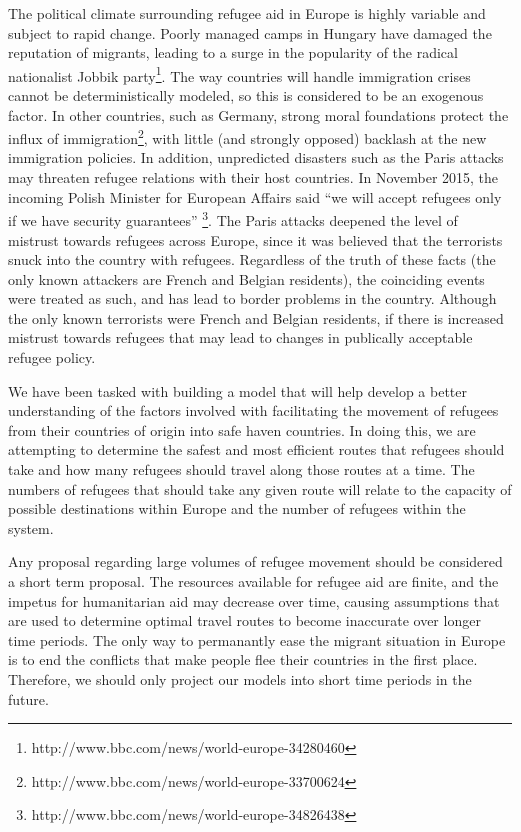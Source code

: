 \documentclass{article}
\begin{document}
The political climate surrounding refugee aid in Europe is highly variable and subject to rapid change. Poorly managed camps in Hungary have damaged the reputation of migrants, leading to a surge in the popularity of the radical nationalist Jobbik party\footnote{http://www.bbc.com/news/world-europe-34280460}. The way countries will handle immigration crises cannot be deterministically modeled, so this is considered to be an exogenous factor. In other countries, such as Germany, strong moral foundations protect the influx of immigration\footnote{http://www.bbc.com/news/world-europe-33700624}, with little (and strongly opposed) backlash at the new immigration policies. In addition, unpredicted disasters such as the Paris attacks may threaten refugee relations with their host countries. In November 2015, the incoming Polish Minister for European Affairs said ``we will accept refugees only if we have security guarantees'' \footnote{http://www.bbc.com/news/world-europe-34826438}. The Paris attacks deepened the level of mistrust towards refugees across Europe, since it was believed that the terrorists snuck into the country with refugees. Regardless of the truth of these facts (the only known attackers are French and Belgian residents), the coinciding events were treated as such, and has lead to border problems in the country. Although the only known terrorists were French and Belgian residents, if there is increased mistrust towards refugees that may lead to changes in publically acceptable refugee policy.

We have been tasked with building a model that will help develop a better understanding of the factors involved with facilitating the movement of refugees from their countries of origin into safe haven countries. In doing this, we are attempting to determine the safest and most efficient routes that refugees should take and how many refugees should travel along those routes at a time. The numbers of refugees that should take any given route will relate to the capacity of possible destinations within Europe and the number of refugees within the system. 

Any proposal regarding large volumes of refugee movement should be considered a short term proposal. The resources available for refugee aid are finite, and the impetus for humanitarian aid may decrease over time, causing assumptions that are used to determine optimal travel routes to become inaccurate over longer time periods. The only way to permanantly ease the migrant situation in Europe is to end the conflicts that make people flee their countries in the first place. Therefore, we should only project our models into short time periods in the future.
\end{document}

